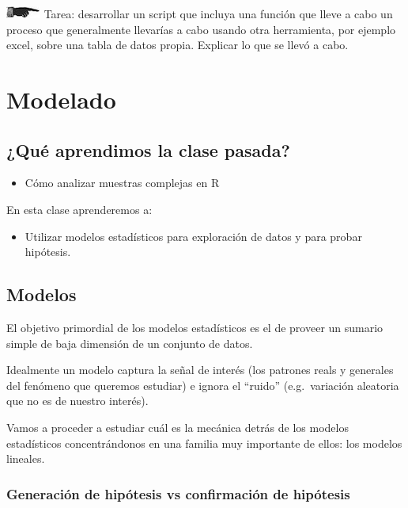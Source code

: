 \documentclass[]{book}
\providecommand{\tightlist}{%
  \setlength{\itemsep}{0pt}\setlength{\parskip}{0pt}}
\theoremstyle{definition}
\theoremstyle{definition}
\theoremstyle{definition}
\theoremstyle{remark}
\begin{document}
\includegraphics{./imagenes/manicule2.jpg} Tarea: desarrollar un script
que incluya una función que lleve a cabo un proceso que generalmente
llevarías a cabo usando otra herramienta, por ejemplo excel, sobre una
tabla de datos propia. Explicar lo que se llevó a cabo.

\chapter{Modelado}\label{modelado}

\section{¿Qué aprendimos la clase
pasada?}\label{que-aprendimos-la-clase-pasada-4}

\begin{itemize}
\tightlist
\item
  Cómo analizar muestras complejas en R
\end{itemize}

En esta clase aprenderemos a:

\begin{itemize}
\tightlist
\item
  Utilizar modelos estadísticos para exploración de datos y para probar
  hipótesis.
\end{itemize}

\section{Modelos}\label{modelos}

El objetivo primordial de los modelos estadísticos es el de proveer un
sumario simple de baja dimensión de un conjunto de datos.

Idealmente un modelo captura la señal de interés (los patrones reals y
generales del fenómeno que queremos estudiar) e ignora el ``ruido''
(e.g.~variación aleatoria que no es de nuestro interés).

Vamos a proceder a estudiar cuál es la mecánica detrás de los modelos
estadísticos concentrándonos en una familia muy importante de ellos: los
modelos lineales.

\subsection{Generación de hipótesis vs confirmación de
hipótesis}\label{generacion-de-hipotesis-vs-confirmacion-de-hipotesis}
\end{document}
